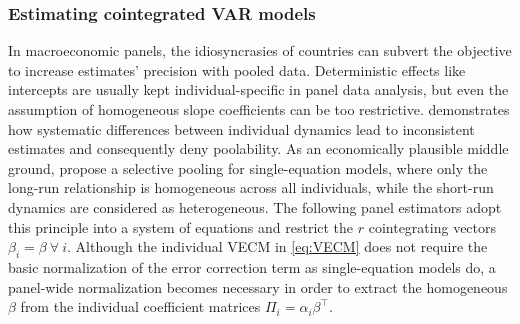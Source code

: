 \subsubsection{Estimating cointegrated VAR models}
In macroeconomic panels, the idiosyncrasies of countries can subvert the objective to increase estimates' precision with pooled data. Deterministic effects like intercepts are usually kept individual-specific in panel data analysis, but even the assumption of homogeneous slope coefficients can be too restrictive. \citet{PesaranSmith1995} demonstrates how systematic differences between individual dynamics lead to inconsistent estimates and consequently deny poolability. As an economically plausible middle ground, \citet{PesaranEtAl1999} propose a selective pooling for single-equation models, where only the long-run relationship is homogeneous across all individuals, while the short-run dynamics are considered as heterogeneous. The following panel estimators adopt this principle into a system of equations and restrict the $ r $ cointegrating vectors $ \beta_i = \beta \ \forall \ i $. Although the individual VECM in \eqref{eq:VECM} does not require the basic normalization of the error correction term as single-equation models do, a panel-wide normalization becomes necessary in order to extract the homogeneous $ \beta $ from the individual coefficient matrices $ \Pi_i = \alpha_i \beta^\top $.


